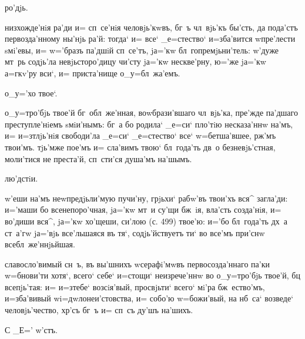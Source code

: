 
ро'дjь.

низхожде'нiя ра'ди и= сп~се'нiя человjь'кwвъ, бг~ъ 
чл~вjь'къ бы'сть, да пода'стъ первозда'нному ны'нjь ра'й: 
тогда` и= все` _е=стество` и=зба'вится w\т пре'лести 
sмi'евы, и= w='бразъ па'дшiй сп~се'тъ, jа='кw 
бл~гопремjьни'тель: w'дуже мт~рь содjь'ла 
невjьсторо'дицу чи'сту jа='кw нескве'рну, ю='же jа='кw 
а=гкv'ру вси`, и= приста'нище о_у=бл~жа'емъ.

о_у='хо твое`.

о_у=тро'бjь твое'й бг~обл~же'нная, воwбрази'вшаго 
чл~вjь'ка, пре'жде па'дшаго преступле'нiемъ sмiи'нымъ: 
бг~а бо родила` _е=си` пло'тiю несказа'ннw на'мъ, и= 
и=з\ъ тлjь'нiя свободи'ла _е=си` _е=стество` все` 
w=бетша'вшее, рж'мъ твои'мъ. тjь'мже пое'мъ и= 
сла'вимъ твою` бл~года'ть дв~о безневjь'стная, моли'тися 
не преста'й, сп~сти'ся душа'мъ на'шымъ.

лю'дстiи.

w'еши на'мъ неwпредjьли'мую пучи'ну, грjьхи` рабw'въ 
твои'хъ вся^ загла'ди: и='маши бо всенепоро'чная, jа='кw 
мт~и су'щи бж~iя, вла'сть созда'нiя, и= во'диши вся^, 
jа='кw хо'щеши, си'лою (с. 499) твое'ю: и='бо бл~года'ть 
дх~а ст~а'гw jа='вjь все'льшаяся въ тя`, содjь'йствуетъ 
ти` во все'мъ при'снw всебл~же'ннjьйшая.

славосло'вимый сн~ъ, въ вы'шнихъ w\т серафi'мwвъ 
первосозда'ннаго па'ки w=бнови'ти хотя`, всего` себе` 
и=стощи` неизрече'ннw во о_у=тро'бjь твое'й, бц 
всепjь'тая: и= и=з\ъ тебе` возсiя'вый, просвjьти` всего` 
мi'ра бж~ество'мъ, и=зба'вивый w\т i=дwлонеи'стовства, и= 
собо'ю w=божи'вый, на нб~са` возведе` человjь'чество, 
хр'съ бг~ъ и= сп~съ ду'шъ на'шихъ.

С%
_Е='%
w'стъ.%
